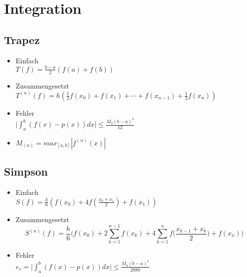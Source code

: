 \section{Integration}

\subsection{Trapez}
\begin{itemize}
	\item Einfach \\
	$T(f) = \frac{b-a}{2} (f(a) + f(b))$
	
	\item Zusammengesetzt \\
	$T^{(n)}(f) = h (\frac{1}{2} f(x_0) + f(x_1) + \cdots + f(x_{n-1}) + \frac{1}{2} f(x_n))$
	
	\item Fehler \\
	$\bigg|\int_a^b (f(x)-p(x)) dx \bigg| \leq \frac{M_2(b-a)^3}{12}$

	\item $M_{(n)} = max_{[a,b]}|f^{(n)}(x)|$
	
\end{itemize}

\subsection{Simpson}
\begin{itemize}
	\item Einfach \\
	$S(f) = \frac{h}{6} (f(x_0) + 4 f(\frac{x_0+x_1}{2}) + f(x_1))$
	
	\item Zusammengesetzt \\
	\begin{equation*}
		S^{(n)}(f) = \frac{h}{6} \bigg(f(x_0) + 2 \sum_{k=1}^{n-1}f(x_k) + 4 \sum_{k=1}^nf\big(\frac{x_{k-1}+x_k}{2} \big) + f(x_n) \bigg)
	\end{equation*}
	
	\item Fehler \\
	$e_v = \bigg|\int_a^b (f(x)-p(x)) dx \bigg| \leq \frac{M_4(b-a)^5}{2880}$
\end{itemize}

